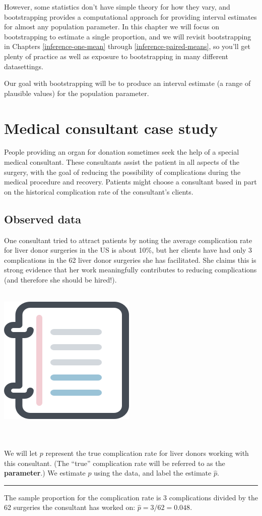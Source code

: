 \documentclass[
  10pt,
  openany]{book}
\newenvironment{mdframedwithfootGPWE}
{   
    \savenotes
    \begin{mdframed}[%
    topline=true, bottomline=true, linecolor=oiB, linewidth=0.5pt,
    rightline=false, leftline=false,
    backgroundcolor=oiLGray]
    \renewcommand{\thempfootnote}{\arabic{footnote}}
    }
{
    \end{mdframed}
    \spewnotes
}
\newenvironment{workedexample}{
    \let\oldrule\rule
    \renewcommand{\rule}[2]{\vspace{-2mm}\oldrule{##1}{##2}\vspace{-2mm}}
\vspace{4mm}
\begin{mdframedwithfootGPWE}
\begin{minipage}[t]{0.10\textwidth}
{$\:$ \\ \setkeys{Gin}{width=2.5em,keepaspectratio}\includegraphics{images/_icons/worked-example.png}}
\end{minipage}
\hfill
\begin{minipage}[t]{0.90\textwidth}
\vspace{-2mm}
\setlength{\parskip}{1em}
\noindent\textbf{\color{oiB}\small\fontfamily{phv}\selectfont{\MakeUppercase{Example}}} $\:$ \\ \\
}{\end{minipage}
\end{mdframedwithfootGPWE}
\vspace{4mm}
}
\begin{document}
However, some statistics don't have simple theory for how they vary, and bootstrapping provides a computational approach for providing interval estimates for almost any population parameter.
In this chapter we will focus on bootstrapping to estimate a single proportion, and we will revisit bootstrapping in Chapters \ref{inference-one-mean} through \ref{inference-paired-means}, so you'll get plenty of practice as well as exposure to bootstrapping in many different datasettings.

Our goal with bootstrapping will be to produce an interval estimate (a range of plausible values) for the population parameter.

\hypertarget{case-study-med-consult}{%
\section{Medical consultant case study}\label{case-study-med-consult}}

People providing an organ for donation sometimes seek the help of a special medical consultant.
These consultants assist the patient in all aspects of the surgery, with the goal of reducing the possibility of complications during the medical procedure and recovery.
Patients might choose a consultant based in part on the historical complication rate of the consultant's clients.

\hypertarget{observed-data-2}{%
\subsection{Observed data}\label{observed-data-2}}

One consultant tried to attract patients by noting the average complication rate for liver donor surgeries in the US is about 10\%, but her clients have had only 3 complications in the 62 liver donor surgeries she has facilitated.
She claims this is strong evidence that her work meaningfully contributes to reducing complications (and therefore she should be hired!).

\begin{workedexample}
We will let \(p\) represent the true complication rate for liver donors working with this consultant.
(The ``true'' complication rate will be referred to as the \textbf{parameter}.) We estimate \(p\) using the data, and label the estimate \(\hat{p}.\)

\begin{center}\rule{0.5\linewidth}{0.5pt}\end{center}

The sample proportion for the complication rate is 3 complications divided by the 62 surgeries the consultant has worked on: \(\hat{p} = 3/62 = 0.048.\)

\end{workedexample}
\end{document}
